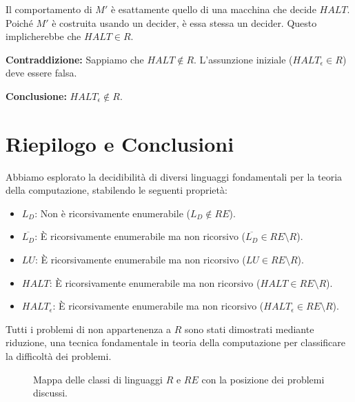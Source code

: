 \documentclass[a4paper]{article}
\makeatletter
\theoremstyle{definition} %
\renewenvironment{proof}[1][\proofname]{\par
  \pushQED{\qed}%
  \normalfont \topsep6\p@\@plus6\p@\relax
  \trivlist
  \item[\hskip\labelsep
        \bfseries
    #1\@addpunct{.}]\ignorespaces
}{%
  \popQED\endtrivlist\@endpefalse
}
\makeatother
\begin{document}
\begin{proof}
Il comportamento di $M'$ è esattamente quello di una macchina che decide $HALT$. Poiché $M'$ è costruita usando un decider, è essa stessa un decider. Questo implicherebbe che $HALT \in R$.

\textbf{Contraddizione:} Sappiamo che $HALT \notin R$.
L'assunzione iniziale ($HALT_\epsilon \in R$) deve essere falsa.

\textbf{Conclusione:} $HALT_\epsilon \notin R$.
\end{proof}

\section{Riepilogo e Conclusioni}
Abbiamo esplorato la decidibilità di diversi linguaggi fondamentali per la teoria della computazione, stabilendo le seguenti proprietà:
\begin{itemize}
    \item $L_D$: Non è ricorsivamente enumerabile ($L_D \notin RE$).
    \item $\overline{L_D}$: È ricorsivamente enumerabile ma non ricorsivo ($\overline{L_D} \in RE \setminus R$).
    \item $LU$: È ricorsivamente enumerabile ma non ricorsivo ($LU \in RE \setminus R$).
    \item $HALT$: È ricorsivamente enumerabile ma non ricorsivo ($HALT \in RE \setminus R$).
    \item $HALT_\epsilon$: È ricorsivamente enumerabile ma non ricorsivo ($HALT_\epsilon \in RE \setminus R$).
\end{itemize}
Tutti i problemi di non appartenenza a $R$ sono stati dimostrati mediante riduzione, una tecnica fondamentale in teoria della computazione per classificare la difficoltà dei problemi.

\begin{figure}[h!]
    \centering
    \caption{Mappa delle classi di linguaggi $R$ e $RE$ con la posizione dei problemi discussi.}
    \label{fig:r_re_map_updated}
\end{figure}
\end{document}
